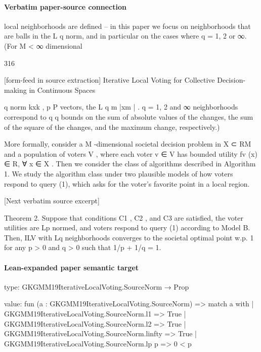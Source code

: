\documentclass[10pt]{article}
\begin{document}
\paragraph{Verbatim paper-source connection}
\begin{ReviewVerbatim}
local neighborhoods are defined – in this paper we focus on neighborhoods that are balls in
the L
     q norm, and in particular on the cases where q = 1, 2 or ∞. (For M < ∞ dimensional



                                              316

[form-feed in source extraction]
   Iterative Local Voting for Collective Decision-making in Continuous Spaces

               q norm kxk ,
                                p P
vectors, the L                              q
                                     m |xm | .   q = 1, 2 and ∞ neighborhoods correspond to
                                q
                         q
bounds on the sum of absolute values of the changes, the sum of the square of the changes,
and the maximum change, respectively.)

   More formally, consider a M -dimensional societal decision problem in X  ⊂ RM and a
population of voters V , where each voter v ∈ V has bounded utility fv (x) ∈ R, ∀ x ∈ X .
Then we consider the class of algorithms described in Algorithm 1. We study the algorithm
class under two plausible models of how voters respond to query (1), which asks for the
voter's favorite point in a local region.



[Next verbatim source excerpt]

Theorem 2. Suppose that conditions C1 , C2 , and C3 are satisfied, the voter utilities are
Lp normed, and voters respond to query (1) according to Model B. Then, ILV with Lq
neighborhoods converges to the societal optimal point w.p. 1 for any p > 0 and q > 0 such
that 1/p + 1/q = 1.
\end{ReviewVerbatim}



\paragraph{Lean-expanded paper semantic target}
\begin{ReviewVerbatim}
type:
GKGMM19IterativeLocalVoting.SourceNorm → Prop

value:
fun (a : GKGMM19IterativeLocalVoting.SourceNorm) =>
  match a with
  | GKGMM19IterativeLocalVoting.SourceNorm.l1 => True
  | GKGMM19IterativeLocalVoting.SourceNorm.l2 => True
  | GKGMM19IterativeLocalVoting.SourceNorm.linfty => True
  | GKGMM19IterativeLocalVoting.SourceNorm.lp p => 0 < p
\end{ReviewVerbatim}
\end{document}
